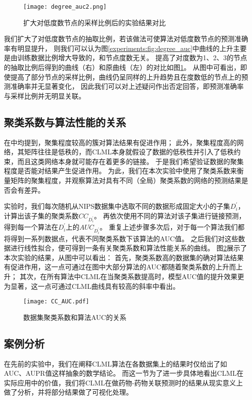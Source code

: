 \begin{figure}
    \centering
    \texttt{[image: degree\_auc2.png]}
    \caption{扩大对低度数节点的采样比例后的实验结果对比}
    \label{experiments:fig:degree_auc2}
\end{figure}

我们扩大了对低度数节点的抽取比例，若该做法可使算法对低度数节点的预测准确率有明显提升，
则我们可以认为图\ref{experiments:fig:degree_auc}中曲线的上升主要是由训练数据比例增大导致的，和节点度数无关。
提高了对度数为1、2、3的节点的抽取比例后得到的曲线（右）和原曲线（左）的对比如图\ref{experiments:fig:degree_auc2}。
从图中可看出，即使提高了部分节点的采样比例，曲线仍呈同样的上升趋势且在度数低的节点上的预测准确率并无显著变化，
因此我们可以对上述疑问作出否定回答，即预测准确率与采样比例并无明显关联。


\subsection{聚类系数与算法性能的关系}
在\cite{lu2011link}\cite{valverde2014link}中均提到，聚集程度较高的簇对算法结果有促进作用；
此外，聚集程度高的网络，其矩阵往往是低秩的，而CLML本身就假设了数据的低秩性并引入了低秩约束，而且这类网络本身就可能存在着更多的链接。
于是我们希望验证数据的聚集程度是否能对结果产生促进作用。
为此，我们在本次实验中使用了聚类系数\cite{barrat2000properties}来衡量矩阵的聚集程度，并观察算法对具有不同（全局）聚类系数的网络的预测结果是否会有差异。

实验时，我们每次随机从NIPS数据集中选取不同的数据形成固定大小的子集$D_i^{'}$，计算出该子集的聚类系数$CC_{D_i^{'}}$。
再依次使用不同的算法对该子集进行链接预测，得到每一个算法在$D_i^{'}$上的$AUC_{D_i^{'}}$。
重复上述步骤多次后，对于每一个算法我们都将得到一系列数据点，代表不同聚类系数下该算法的AUC值。
之后我们对这些数据进行线性拟合，便可得到一条有关聚类系数和算法性能关系的曲线。
图\ref{experiments:fig:cc_auc}展示了本次实验的结果，从图中可以看出：
首先，聚类系数高的数据集的确对算法结果有促进作用，这一点可通过在图中大部分算法的AUC都随着聚类系数的上升而上升；
其次，在所有算法中CLML在当聚类系数提高时，模型AUC值的提升效果更为显著，这一点可通过CLML曲线具有较高的斜率中看出。


\begin{figure}
    \centering
    \texttt{[image: CC\_AUC.pdf]}
    \caption{数据集聚类系数和算法AUC的关系}
    \label{experiments:fig:cc_auc}
\end{figure}


\subsection{案例分析}
在先前的实验中，我们在阐释CLML算法在各数据集上的结果时仅给出了如AUC、AUPR值这样抽象的数学结论。
而这一节为了进一步具体地看出CLML在实际应用中的价值，我们将CLML在做药物-药物关联预测时的结果从现实意义上做了分析，并将部分结果做了可视化处理。


